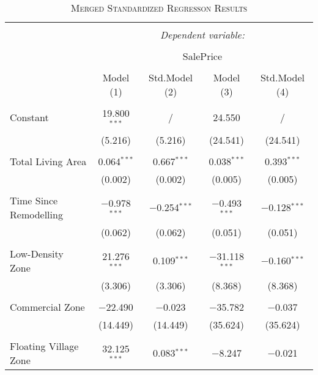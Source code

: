 \documentclass[a4paper]{article}
\begin{document}
\begin{table}[!htbp] \centering 
\begin{adjustwidth}{-0.0cm}{-0cm}
\begin{threeparttable}
\small
\captionsetup{font=small, justification=raggedright,singlelinecheck=false}
\caption{\textsc{Merged Standardized Regresson Results}}
\centering 
  \label{}
\small 
\begin{tabular}{@{\extracolsep{-1pt}}lcccc} 
\\[-5.8ex]\hline 
\hline \\[-1.8ex] 
 & \multicolumn{4}{c}{\textit{Dependent variable:}} \\ 
\cline{2-5} 
\\[-1.8ex] & \multicolumn{4}{c}{SalePrice} \\ 
\\[-1.8ex] & Model (1) & Std.Model (2) & Model (3) & Std.Model (4)\\ 
\hline \\[-1.8ex] 
 Constant & 19.800$^{***}$ & / & 24.550 & / \\ 
  & (5.216) & (5.216) & (24.541) & (24.541) \\ 
  & & & & \\ 
 Total Living Area & 0.064$^{***}$ & 0.667$^{***}$ & 0.038$^{***}$ & 0.393$^{***}$ \\ 
  & (0.002) & (0.002) & (0.005) & (0.005) \\ 
  & & & & \\ 
 Time Since Remodelling & $-$0.978$^{***}$ & $-$0.254$^{***}$ & $-$0.493$^{***}$ & $-$0.128$^{***}$ \\ 
  & (0.062) & (0.062) & (0.051) & (0.051) \\ 
  & & & & \\ 
 Low-Density Zone & 21.276$^{***}$ & 0.109$^{***}$ & $-$31.118$^{***}$ & $-$0.160$^{***}$ \\ 
  & (3.306) & (3.306) & (8.368) & (8.368) \\ 
  & & & & \\ 
 Commercial Zone & $-$22.490 & $-$0.023 & $-$35.782 & $-$0.037 \\ 
  & (14.449) & (14.449) & (35.624) & (35.624) \\ 
  & & & & \\ 
 Floating Village Zone & 32.125$^{***}$ & 0.083$^{***}$ & $-$8.247 & $-$0.021 \\ 

\end{tabular}
\end{threeparttable}
\end{adjustwidth}
\end{table}
\end{document}
